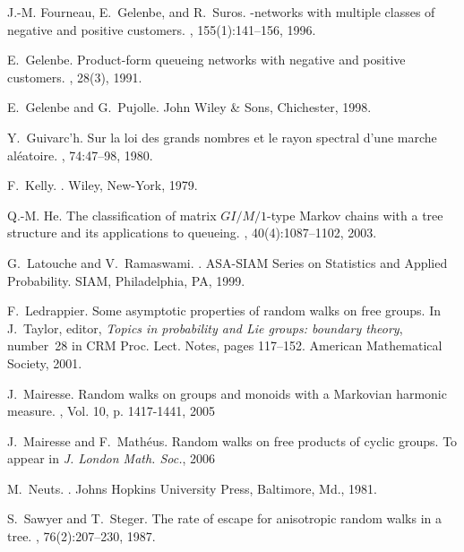 \documentclass[11pt,a4paper]{article}
\theoremstyle{remark}
\begin{document}
\begin{thebibliography}{10}
J.-M. Fourneau, E.~Gelenbe, and R.~Suros.
-networks with multiple classes of negative and positive
  customers.
, 155(1):141--156, 1996.

E.~Gelenbe.
\newblock Product-form queueing networks with negative and positive customers.
, 28(3), 1991.

E.~Gelenbe and G.~Pujolle.
\newblock John Wiley \& Sons, Chichester, 1998.

Y.~Guivarc'h.
\newblock Sur la loi des grands nombres et le rayon spectral d'une marche
  al\'eatoire.
, 74:47--98, 1980.

F.~Kelly.
.
\newblock Wiley, New-York, 1979.

Q.-M. He.
\newblock The classification of matrix {$GI/M/1$}-type {M}arkov chains with a
  tree structure and its applications to queueing.
, 40(4):1087--1102, 2003.


G.~Latouche and V.~Ramaswami.
.
\newblock ASA-SIAM Series on Statistics and Applied Probability. SIAM,
  Philadelphia, PA, 1999.

F.~Ledrappier.
\newblock Some asymptotic properties of random walks on free groups.
\newblock In J.~Taylor, editor, {\em Topics in probability and Lie groups:
  boundary theory}, number~28 in CRM Proc. Lect. Notes, pages 117--152.
  American Mathematical Society, 2001.

J.~Mairesse.
\newblock Random walks on groups and monoids with a {M}arkovian harmonic
  measure.
, Vol. 10, p. 1417-1441, 2005

J.~Mairesse and F.~Math\'eus.
\newblock Random walks on free products of cyclic groups.
\newblock To appear in {\em J. London Math. Soc.}, 2006

M.~Neuts.
.
\newblock Johns Hopkins University Press, Baltimore, Md., 1981.

S.~Sawyer and T.~Steger.
\newblock The rate of escape for anisotropic random walks in a tree.
, 76(2):207--230, 1987.


\end{thebibliography}
\end{document}
